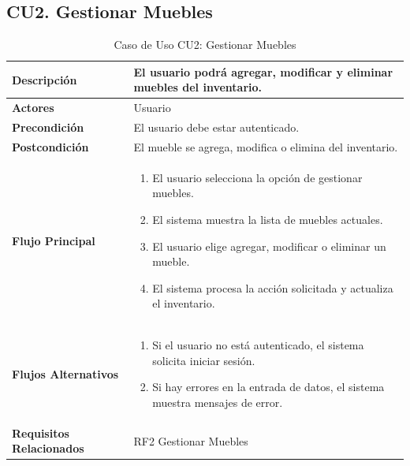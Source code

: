 \documentclass{article}
\begin{document}
\subsection{CU2. Gestionar Muebles}
\begin{table}[H]
    \centering
    \begin{tabular}{|l|p{10cm}|}
        \hline
        \textbf{Descripción} & El usuario podrá agregar, modificar y eliminar muebles del inventario. \\ \hline
        \textbf{Actores} & Usuario \\ \hline
        \textbf{Precondición} & El usuario debe estar autenticado. \\ \hline
        \textbf{Postcondición} & El mueble se agrega, modifica o elimina del inventario. \\ \hline
        \textbf{Flujo Principal} & 
        \begin{enumerate}
            \item El usuario selecciona la opción de gestionar muebles.
            \item El sistema muestra la lista de muebles actuales.
            \item El usuario elige agregar, modificar o eliminar un mueble.
            \item El sistema procesa la acción solicitada y actualiza el inventario.
        \end{enumerate} \\ \hline
        \textbf{Flujos Alternativos} & 
        \begin{enumerate}
            \item Si el usuario no está autenticado, el sistema solicita iniciar sesión.
            \item Si hay errores en la entrada de datos, el sistema muestra mensajes de error.
        \end{enumerate} \\ \hline
        \textbf{Requisitos Relacionados} & RF2 Gestionar Muebles \\ \hline
    \end{tabular}
    \caption{Caso de Uso CU2: Gestionar Muebles}
\end{table}
\end{document}
